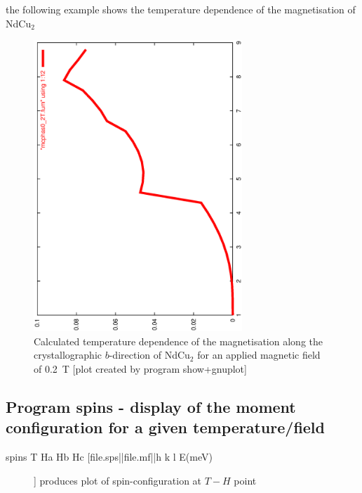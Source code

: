 the following example shows the temperature dependence of the magnetisation
of NdCu$_2$

\begin{figure}[hb]%
\begin{center}\leavevmode
\includegraphics[angle=-90, width=0.7\textwidth]{figsrc/ndcu2b/resultss/mag0_2T.ps}
\end{center}
\caption{Calculated temperature dependence of the magnetisation  along the crystallographic
$b$-direction  of NdCu$_2$ for an applied magnetic field of 0.2~T 
[plot created by program {\prg show+gnuplot}]}
\label{magnetizationgraphic}
\end{figure}

\subsection{Program {\prg spins} - display of the moment configuration for a given %
temperature/field}
\label{spins}

\begin{description} 
\item [spins T Ha Hb Hc [file.sps||file.mf||h k l E(meV)]]       produces plot of spin-configuration at $T-H$ %
point
\end{description} 

